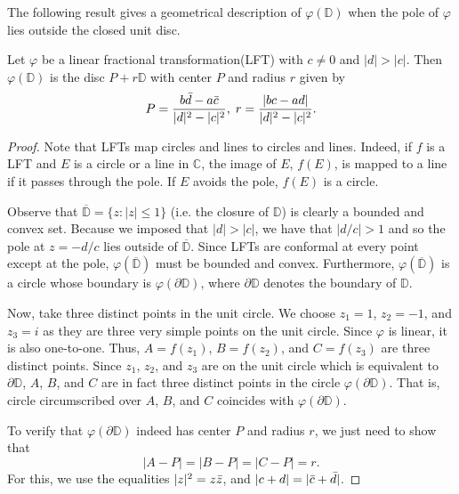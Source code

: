 The following result gives a geometrical description of $\varphi(\mathbb{D})$ when the pole of $\varphi$ lies outside the closed unit disc.

\begin{lemma}
Let $\varphi$ be a linear fractional transformation(LFT) with $c \neq 0$ and $|d| > |c|$.  Then $\varphi(\mathbb{D})$ is the disc $P+r\mathbb{D}$ with center $P$ and radius $r$ given by
\[P = \frac{b\bar{d} - a\bar{c}}{|d|^2 - |c|^2}, \;r = \frac{|bc - ad|}{|d|^2 - |c|^2}.\]
\end{lemma}

\begin{proof}
Note that LFTs map circles and lines to circles and lines.  Indeed, if $f$ is a LFT and $E$ is a circle or a line in $\mathbb{C}$, the image of $E$, $f(E)$, is mapped to a line if it passes through the pole.  If $E$ avoids the pole, $f(E)$ is a circle.

Observe that $\overbar{\mathbb{D}} = \{z:|z| \leq 1\}$ (i.e. the closure of $\mathbb{D}$) is clearly a bounded and convex set.  Because we imposed that $|d| > |c|$, we have that $|d/c| > 1$ and so the pole at $z = -d/c$ lies outside of $\overbar{\mathbb{D}}$.  Since LFTs are conformal at every point except at the pole, $\varphi(\overbar{\mathbb{D}})$ must be bounded and convex.  Furthermore, $\varphi(\overbar{\mathbb{D}})$ is a circle whose boundary is $\varphi(\partial\mathbb{D})$, where $\partial\mathbb{D}$ denotes the boundary of $\mathbb{D}$.

Now, take three distinct points in the unit circle.  We choose $z_1 = 1$, $z_2 = -1$, and $z_3 = i$ as they are three very simple points on the unit circle.  Since $\varphi$ is linear, it is also one-to-one.  Thus, $A = f(z_1)$, $B = f(z_2)$, and $C = f(z_3)$ are three distinct points.  Since $z_1$, $z_2$, and $z_3$ are on the unit circle which is equivalent to $\partial\mathbb{D}$, $A$, $B$, and $C$ are in fact three distinct points in the circle $\varphi(\partial\mathbb{D})$.  That is, circle circumscribed over $A$, $B$, and $C$ coincides with $\varphi(\partial\mathbb{D})$.

To verify that $\varphi(\partial\mathbb{D})$ indeed has center $P$ and radius $r$, we just need to show that 
\[|A-P| = |B-P| = |C-P| = r.\]
For this, we use the equalities $|z|^2 = z\bar{z}$, and $|c + d| = |\bar{c} + \bar{d}|$.


\end{proof}
